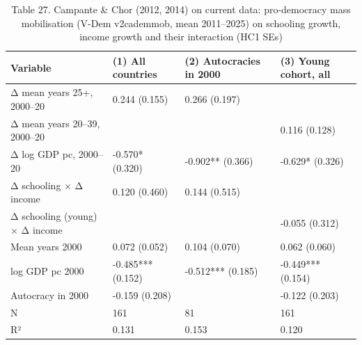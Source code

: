 \begin{table}
\caption{Table 27. Campante & Chor (2012, 2014) on current data: pro-democracy mass mobilisation (V-Dem v2cademmob, mean 2011–2025) on schooling growth, income growth and their interaction (HC1 SEs)}
\label{tab:T27_campante_chor}
\begin{tabular}{llll}
\toprule
Variable & (1) All countries & (2) Autocracies in 2000 & (3) Young cohort, all \\
\midrule
Δ mean years 25+, 2000–20 & 0.244 (0.155) & 0.266 (0.197) &  \\
Δ mean years 20–39, 2000–20 &  &  & 0.116 (0.128) \\
Δ log GDP pc, 2000–20 & -0.570* (0.320) & -0.902** (0.366) & -0.629* (0.326) \\
Δ schooling × Δ income & 0.120 (0.460) & 0.144 (0.515) &  \\
Δ schooling (young) × Δ income &  &  & -0.055 (0.312) \\
Mean years 2000 & 0.072 (0.052) & 0.104 (0.070) & 0.062 (0.060) \\
log GDP pc 2000 & -0.485*** (0.152) & -0.512*** (0.185) & -0.449*** (0.154) \\
Autocracy in 2000 & -0.159 (0.208) &  & -0.122 (0.203) \\
N & 161 & 81 & 161 \\
R² & 0.131 & 0.153 & 0.120 \\
\bottomrule
\end{tabular}
\end{table}
